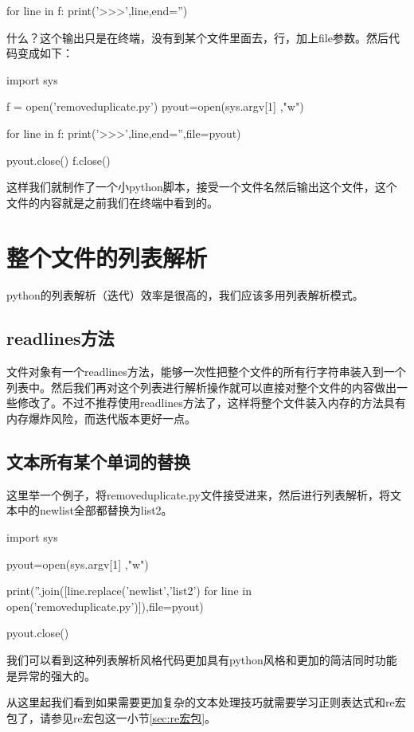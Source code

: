 \documentclass[12pt,oneside]{book}
\begin{document}
\begin{common-format}
\begin{tcbpython}
for line in f:
    print('>>>',line,end='')
\end{tcbpython}

什么？这个输出只是在终端，没有到某个文件里面去，行，加上file参数。然后代码变成如下：
\begin{tcbpython}
import sys

f = open('removeduplicate.py')
pyout=open(sys.argv[1] ,"w")

for line in f:
    print('>>>',line,end='',file=pyout)

pyout.close()
f.close()
\end{tcbpython}
这样我们就制作了一个小python脚本，接受一个文件名然后输出这个文件，这个文件的内容就是之前我们在终端中看到的。

\section{整个文件的列表解析}
python的列表解析（迭代）效率是很高的，我们应该多用列表解析模式。

\subsection{readlines方法}
文件对象有一个readlines方法，能够一次性把整个文件的所有行字符串装入到一个列表中。然后我们再对这个列表进行解析操作就可以直接对整个文件的内容做出一些修改了。不过不推荐使用readlines方法了，这样将整个文件装入内存的方法具有内存爆炸风险，而迭代版本更好一点。

\subsection{文本所有某个单词的替换}
这里举一个例子，将removeduplicate.py文件接受进来，然后进行列表解析，将文本中的newlist全部都替换为list2。

\begin{tcbpython}
import sys

pyout=open(sys.argv[1] ,"w")

print(''.join([line.replace('newlist','list2') 
for line in open('removeduplicate.py')]),file=pyout)

pyout.close()
\end{tcbpython}

我们可以看到这种列表解析风格代码更加具有python风格和更加的简洁同时功能是异常的强大的。

从这里起我们看到如果需要更加复杂的文本处理技巧就需要学习正则表达式和re宏包了，请参见re宏包这一小节\ref{sec:re宏包}。





\end{common-format}
\end{document}
